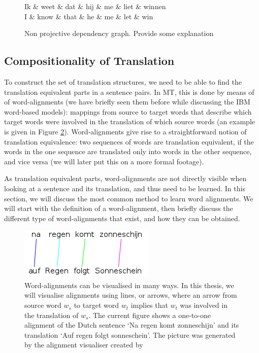 \documentclass{report}
\theoremstyle{definition}
\theoremstyle{plain}
\begin{document}
\begin{figure}[!ht]
\centering
\begin{dependency}[theme=simple]%
\begin{deptext}[column sep=.5cm, row sep=.1ex]
Ik \& weet \& dat \& hij \& me \& liet \& winnen\\
\tiny{I} \& \tiny{know} \& \tiny{that} \& \tiny{he} \& \tiny{me} \& \tiny{let} \& \tiny{win}\\
\end{deptext}
\end{dependency}
\caption{Non projective dependency graph. Provide some explanation}\label{fig:npdeptree}
\end{figure}

\subsection{Compositionality of Translation}
\label{sec:alignments}

To construct the set of translation structures, we need to be able to find the translation equivalent parts in a sentence pairs. In MT, this is done by means of of word-alignments (we have briefly seen them before while discussing the IBM word-based models): mappings from source to target words that describe which target words were involved in the translation of which source words (an example is given in Figure \ref{fig:alignment}). Word-alignments give rise to a straightforward notion of translation equivalence: two sequences of words are translation equivalent, if the words in the one sequence are translated only into words in the other sequence, and vice versa (we will later put this on a more formal footage).

As translation equivalent parts, word-alignments are not directly visible when looking at a sentence and its translation, and thus need to be learned. In this section, we will discuss the most common method to learn word alignments. We will start with the definition of a word-alignment, then briefly discuss the different type of word-alignments that exist, and how they can be obtained.

\begin{figure}[!ht]
\centering
\includegraphics[scale=0.6]{alignment.png}
\caption{Word-alignments can be visualised in many ways. In this thesis, we will visualise alignments using lines, or arrows, where an arrow from source word $w_s$ to target word $w_t$ implies that $w_t$ was involved in the translation of $w_s$. The current figure shows a one-to-one alignment of the Dutch sentence `Na regen komt zonneschijn' and its translation `Auf regen folgt sonneschein'. The picture was generated by the alignment visualiser created by \cite{maillette2010visualizing}}
\label{fig:alignment}
\end{figure}
\end{document}
